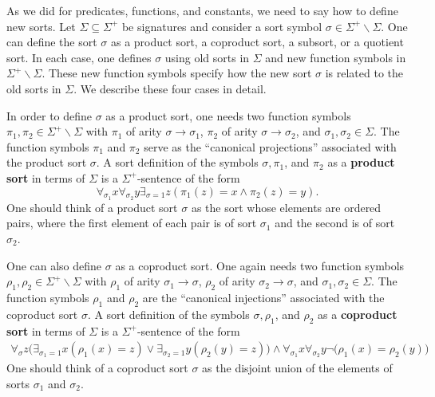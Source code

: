 As we did for predicates, functions, and constants, we need to say how
to define new sorts.  Let $\Sigma\subseteq\Sigma^+$ be signatures and
consider a sort symbol $\sigma\in\Sigma^+\backslash\Sigma$. One can
define the sort $\sigma$ as a product sort, a coproduct sort, a
subsort, or a quotient sort. In each case, one defines $\sigma$ using
old sorts in $\Sigma$ and new function symbols in
$\Sigma^+\backslash\Sigma$. These new function symbols specify how the
new sort $\sigma$ is related to the old sorts in $\Sigma$. We describe
these four cases in detail.

\begin{tomt} In order to define $\sigma$ as a product sort, one needs
  two function symbols $\pi_1,\pi_2\in\Sigma^+\backslash\Sigma$ with
  $\pi_1$ of arity $\sigma\rightarrow\sigma_1$, $\pi_2$ of arity
  $\sigma\rightarrow\sigma_2$, and $\sigma_1,\sigma_2\in\Sigma$. The
  function symbols $\pi_1$ and $\pi_2$ serve as the ``canonical
  projections'' associated with the product sort $\sigma$. A sort
  definition of the symbols $\sigma, \pi_1$, and $\pi_2$ as a
  \textbf{product sort} in terms of $\Sigma$ is a $\Sigma^+$-sentence
  of the form
\[ \forall_{\sigma_1}x\forall_{\sigma_2}
  y\exists_{\sigma=1}z(\pi_1(z)=x\land\pi_2(z)=y) . \]
One should think of a product sort $\sigma$ as the sort whose elements
are ordered pairs, where the first element of each pair is of sort
$\sigma_1$ and the second is of sort $\sigma_2$.
\end{tomt}

\begin{tomt} One can also define $\sigma$ as a coproduct sort. One
  again needs two function symbols
  $\rho_1,\rho_2\in\Sigma^+\backslash\Sigma$ with $\rho_1$ of arity
  $\sigma_1\rightarrow\sigma$, $\rho_2$ of arity
  $\sigma_2\rightarrow\sigma$, and $\sigma_1,\sigma_2\in\Sigma$. The
  function symbols $\rho_1$ and $\rho_2$ are the ``canonical
  injections'' associated with the coproduct sort $\sigma$. A sort
  definition of the symbols $\sigma, \rho_1$, and $\rho_2$ as a
  \textbf{coproduct sort} in terms of $\Sigma$ is a
  $\Sigma^+$-sentence of the form
\begin{gather*}
\forall_\sigma z\big(\exists_{\sigma_1=1}x(\rho_1(x)=z)\lor\exists_{\sigma_2=1} y(\rho_2(y)=z)\big)
\land \forall_{\sigma_1} x\forall_{\sigma_2} y\lnot\big(\rho_1(x)=\rho_2(y)\big)
\end{gather*}
One should think of a coproduct sort $\sigma$ as the disjoint union of
the elements of sorts $\sigma_1$ and $\sigma_2$. \end{tomt}

